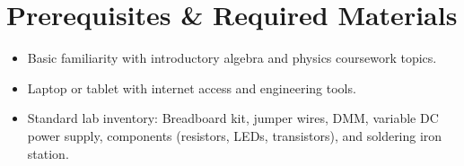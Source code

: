 \documentclass[11pt, a4paper]{report}
\begin{document}
\section*{Prerequisites \& Required Materials}
\begin{itemize}[leftmargin=1.5em]
    \item Basic familiarity with introductory algebra and physics coursework topics.
    \item Laptop or tablet with internet access and engineering tools.
    \item Standard lab inventory: Breadboard kit, jumper wires, DMM, variable DC power supply, components (resistors, LEDs, transistors), and soldering iron station.
\end{itemize}

\tableofcontents
\newpage







\newpage


\end{document}
